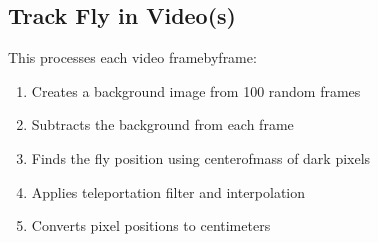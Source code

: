 \documentclass[letterpaper,10pt,english]{jupyterBook}
\begin{document}
\subsection{Track Fly in Video(s)}
\label{\detokenize{FlyTracking/ColabNotebook:track-fly-in-video-s}}
\sphinxAtStartPar
This processes each video frame\sphinxhyphen{}by\sphinxhyphen{}frame:
\begin{enumerate}
%
\item {} 
\sphinxAtStartPar
Creates a background image from 100 random frames

\item {} 
\sphinxAtStartPar
Subtracts the background from each frame

\item {} 
\sphinxAtStartPar
Finds the fly position using center\sphinxhyphen{}of\sphinxhyphen{}mass of dark pixels

\item {} 
\sphinxAtStartPar
Applies teleportation filter and interpolation

\item {} 
\sphinxAtStartPar
Converts pixel positions to centimeters

\end{enumerate}
\end{document}
